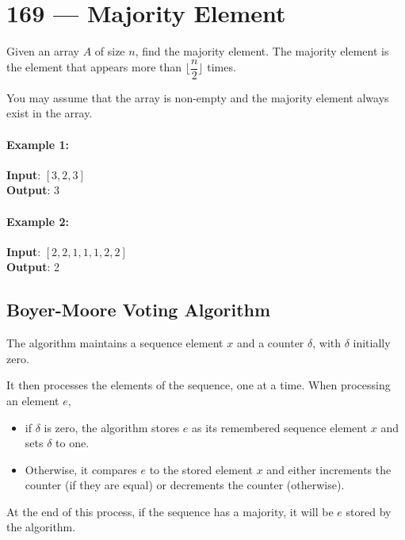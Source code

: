 \section{169 --- Majority Element}
Given an array $A$ of size $n$, find the majority element. The majority element is the element that appears more than $\lfloor \dfrac{n}{2}\rfloor$ times.
\par
You may assume that the array is non-empty and the majority element always exist in the array.
\paragraph{Example 1:}
\begin{flushleft}
\textbf{Input}: $[3,2,3]$
\\
\textbf{Output}: 3
\end{flushleft}
\paragraph{Example 2:}
\begin{flushleft}
\textbf{Input}: $[2,2,1,1,1,2,2]$
\\
\textbf{Output}: 2
\end{flushleft}
\subsection{Boyer-Moore Voting Algorithm}
The algorithm maintains a sequence element $x$ and a counter $\delta$, with $\delta$ initially zero.
\par
It then processes the elements of the sequence, one at a time. When processing an element $e$, 
\begin{itemize}
\item if $\delta$ is zero, the algorithm stores $e$ as its remembered sequence element $x$ and sets $\delta$ to one. 
\item Otherwise, it compares $e$ to the stored element $x$ and either increments the counter (if they are equal) or decrements the counter (otherwise).
\end{itemize}
At the end of this process, if the sequence has a majority, it will be $e$ stored by the algorithm.
